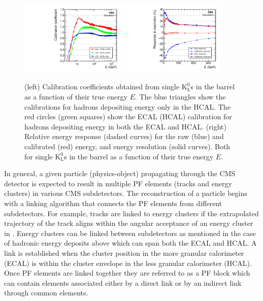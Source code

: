 \begin{figure}[htbp]
\centering
     \includegraphics[width=0.45\textwidth]{object_reconstruction_and_selection/plots/calo_calibrations.pdf}
     \includegraphics[width=0.45\textwidth]{object_reconstruction_and_selection/plots/calo_response_and_res.pdf}
     \caption{
(left) Calibration coefficients obtained from single $\text{K}^{0}_{\text{L}}$s in the barrel as a 
function of their true energy $E$. The blue triangles show the calibrations for hadrons depositing 
energy only in the HCAL. The red circles (green squares) show the ECAL (HCAL) calibration for hadrons
depositing energy in both the ECAL and HCAL.
(right) Relative energy response (dashed curves) for the raw (blue) and calibrated (red) energy, and 
energy resolution (solid curves). Both for single $\text{K}^{0}_{\text{L}}$s in the barrel as a 
function of their true energy $E$.
     }
     \label{fig:pf_calo_calib}
\end{figure}


In general, a given particle (physics-object) propagating through the CMS detector 
is expected to result in multiple PF elements (tracks and energy
clusters) in various CMS subdetectors. The reconstruction of a particle begins 
with a linking algorithm that connects the PF elements from different subdetectors. For example,
tracks are linked to energy clusters if the extrapolated trajectory of the track aligns within the
angular acceptance of an energy cluster in \etaphi. Energy clusters can be linked between subdetectors as mentioned
in the case of hadronic energy deposits above which can span both the ECAL and HCAL. A link is established
when the cluster position in the more granular calorimeter (ECAL) is within the cluster envelope
in the less granular calorimeter (HCAL). Once PF elements are linked together they are referred to as a PF block which can contain 
elements associated either by a direct link or by an indirect link through common elements.


